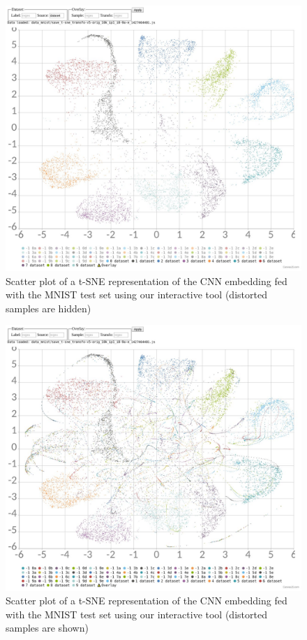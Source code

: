 \documentclass[a4paper,12pt]{report}
\begin{document}
\begin{figure}[h]
    \begin{center}
        \includegraphics[width=\textwidth]{thesis_figures/mnist_nda_tsne.jpg}
    \end{center}
    \caption{Scatter plot of a t-SNE representation of the CNN embedding fed with the MNIST test set using our interactive tool (distorted samples are hidden)}
    \label{fig:mnist_nda_tsne}
\end{figure}

\begin{figure}[h]
    \begin{center}
        \includegraphics[width=\textwidth]{thesis_figures/mnist_nda_tsne2.jpg}
    \end{center}
    \caption{Scatter plot of a t-SNE representation of the CNN embedding fed with the MNIST test set using our interactive tool (distorted samples are shown)}
    \label{fig:mnist_nda_tsne2}
\end{figure}
\end{document}
